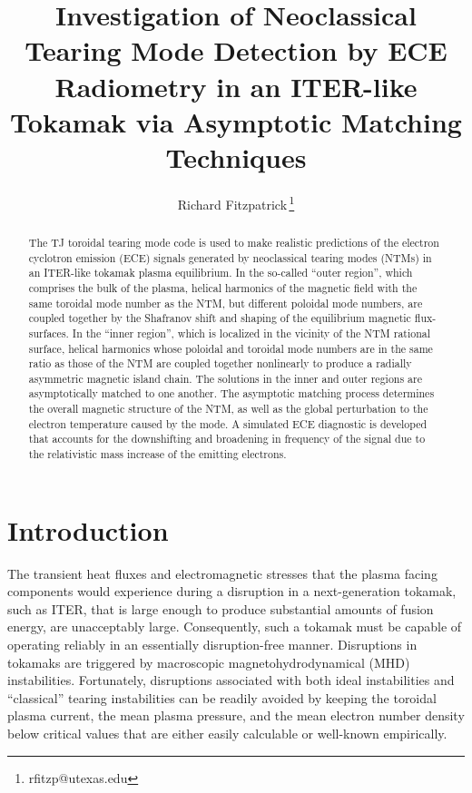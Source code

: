 \documentclass[12pt,prb,aps]{revtex4-1}
\begin{document}
\title{Investigation of Neoclassical Tearing Mode Detection by ECE Radiometry in  an ITER-like Tokamak via Asymptotic Matching Techniques}
\author{Richard Fitzpatrick\,\footnote{rfitzp@utexas.edu}}

\begin{abstract}
The TJ toroidal tearing mode code is used to make realistic predictions of  the electron cyclotron emission (ECE) signals generated by  neoclassical
tearing modes (NTMs) in an ITER-like tokamak plasma equilibrium. In the so-called ``outer region'', which comprises the bulk of the plasma, helical
harmonics of the magnetic field with the same toroidal mode number as the NTM, but different poloidal mode numbers, are coupled together by the Shafranov shift and
shaping of the equilibrium magnetic flux-surfaces. In the ``inner region'', which is localized in the vicinity of the NTM rational surface, helical harmonics whose
poloidal and toroidal mode numbers are in the same ratio as those of the NTM are coupled together nonlinearly to produce a radially asymmetric magnetic
island chain. The solutions in the inner and outer regions are asymptotically matched to one another. The asymptotic matching process determines the
overall magnetic structure of the NTM, as well as the global  perturbation to the electron temperature caused by the mode. A simulated ECE diagnostic is developed that accounts for the
 downshifting and broadening in frequency of the signal due to the relativistic mass increase of the emitting electrons. 

\end{abstract}
\maketitle

\section{Introduction}
The transient heat fluxes and electromagnetic stresses that the plasma facing components would experience during a disruption in
a next-generation tokamak, such as ITER,   that is large enough to produce substantial amounts of fusion energy, are unacceptably large.\cite{iter,wesson}  Consequently, such a tokamak must be capable of  operating reliably in an essentially disruption-free manner. 
Disruptions in tokamaks are triggered by macroscopic magnetohydrodynamical (MHD) instabilities.\cite{jet} Fortunately, disruptions associated with both ideal instabilities   and
``classical'' tearing instabilities can   be readily avoided  by keeping the toroidal plasma current, the  mean plasma pressure, and
the mean electron number density below  critical values that are either easily calculable or well-known empirically.\cite{iter}  
\end{document}
